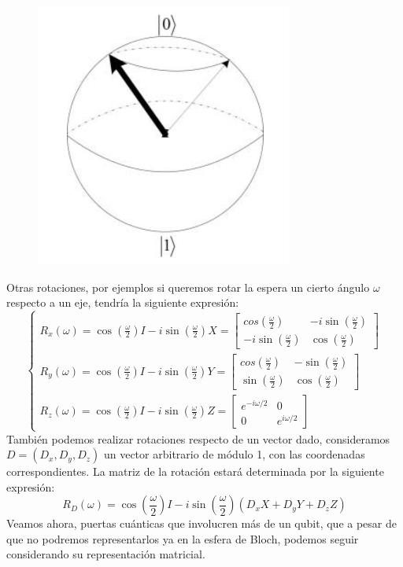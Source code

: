 \documentclass[a4paper]{article}
\numberwithin{equation}{section}
\begin{document}
\begin{figure}[h]
	\centering
	\includegraphics[scale=.65]{rotacion_fase}
\end{figure}
Otras rotaciones, por ejemplos si queremos rotar la espera un cierto ángulo $\omega$ respecto a un eje, tendría la siguiente expresión:
\begin{equation}
\begin{cases}
R_x(\omega) = \cos(\frac{\omega}{2})I -i\sin(\frac{\omega}{2})X =
\begin{bmatrix}
cos(\frac{\omega}{2}) & -i\sin(\frac{\omega}{2}) \\
-i\sin(\frac{\omega}{2}) & \cos(\frac{\omega}{2})
\end{bmatrix} \\
R_y(\omega) = \cos(\frac{\omega}{2})I -i\sin(\frac{\omega}{2})Y =
\begin{bmatrix}
	cos(\frac{\omega}{2}) & -\sin(\frac{\omega}{2}) \\
	\sin(\frac{\omega}{2}) & \cos(\frac{\omega}{2})
\end{bmatrix} \\
R_z(\omega) = \cos(\frac{\omega}{2})I -i\sin(\frac{\omega}{2})Z =
\begin{bmatrix}
	e^{-i\omega/2} & 0 \\
	0 & e^{i\omega/2}
\end{bmatrix}
\end{cases}
\end{equation}
También podemos realizar rotaciones respecto de un vector dado, consideramos $D = (D_x, D_y, D_z)$ un vector arbitrario de módulo 1, con las coordenadas correspondientes. La matriz de la rotación estará determinada por la siguiente expresión:
\begin{equation}
R_D(\omega) = \cos(\frac{\omega}{2})I -i\sin(\frac{\omega}{2})(D_x X + D_y Y + D_z Z)
\end{equation}
Veamos ahora, puertas cuánticas que involucren más de un qubit, que a pesar de que no podremos representarlos ya en la esfera de Bloch, podemos seguir considerando su representación matricial.
\end{document}
